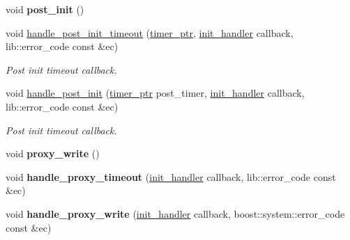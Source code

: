 \begin{DoxyCompactItemize}
\item 
void {\bfseries post\+\_\+init} ()\hypertarget{classwebsocketpp_1_1transport_1_1asio_1_1connection_a04f0f581681c9e263e3fd2e4ce1552ea}{}\label{classwebsocketpp_1_1transport_1_1asio_1_1connection_a04f0f581681c9e263e3fd2e4ce1552ea}

\item 
void \hyperlink{classwebsocketpp_1_1transport_1_1asio_1_1connection_a8c21e2814d440c6fe49a4514f6cf5ff1}{handle\+\_\+post\+\_\+init\+\_\+timeout} (\hyperlink{classwebsocketpp_1_1transport_1_1asio_1_1connection_aa725ead0a0f3733f7f7e57076f194081}{timer\+\_\+ptr}, \hyperlink{namespacewebsocketpp_1_1transport_aeae75e675c1a334b3b33ab7120b480a5}{init\+\_\+handler} callback, lib\+::error\+\_\+code const \&ec)
\begin{DoxyCompactList}\small\item\em Post init timeout callback. \end{DoxyCompactList}\item 
void \hyperlink{classwebsocketpp_1_1transport_1_1asio_1_1connection_a6782049b9d8b324d85da34dd9e426950}{handle\+\_\+post\+\_\+init} (\hyperlink{classwebsocketpp_1_1transport_1_1asio_1_1connection_aa725ead0a0f3733f7f7e57076f194081}{timer\+\_\+ptr} post\+\_\+timer, \hyperlink{namespacewebsocketpp_1_1transport_aeae75e675c1a334b3b33ab7120b480a5}{init\+\_\+handler} callback, lib\+::error\+\_\+code const \&ec)
\begin{DoxyCompactList}\small\item\em Post init timeout callback. \end{DoxyCompactList}\item 
void {\bfseries proxy\+\_\+write} ()\hypertarget{classwebsocketpp_1_1transport_1_1asio_1_1connection_a64771b77883083daab921469fed0cffa}{}\label{classwebsocketpp_1_1transport_1_1asio_1_1connection_a64771b77883083daab921469fed0cffa}

\item 
void {\bfseries handle\+\_\+proxy\+\_\+timeout} (\hyperlink{namespacewebsocketpp_1_1transport_aeae75e675c1a334b3b33ab7120b480a5}{init\+\_\+handler} callback, lib\+::error\+\_\+code const \&ec)\hypertarget{classwebsocketpp_1_1transport_1_1asio_1_1connection_a5bf6d19bdada66f4880182f632fe88e0}{}\label{classwebsocketpp_1_1transport_1_1asio_1_1connection_a5bf6d19bdada66f4880182f632fe88e0}

\item 
void {\bfseries handle\+\_\+proxy\+\_\+write} (\hyperlink{namespacewebsocketpp_1_1transport_aeae75e675c1a334b3b33ab7120b480a5}{init\+\_\+handler} callback, boost\+::system\+::error\+\_\+code const \&ec)\hypertarget{classwebsocketpp_1_1transport_1_1asio_1_1connection_a9cae467d224b74665a9fa8e56c68c961}{}\label{classwebsocketpp_1_1transport_1_1asio_1_1connection_a9cae467d224b74665a9fa8e56c68c961}


\end{DoxyCompactItemize}
